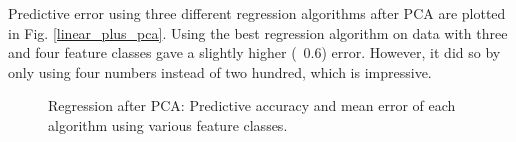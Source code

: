 Predictive error using three different regression algorithms after PCA are plotted in Fig. \ref{linear_plus_pca}. Using the best regression algorithm on data with three and four feature classes gave a slightly higher (~0.6) error. However, it did so by only using four numbers instead of two hundred, which is impressive.

\begin{figure}[t]
\centering
{}
\caption{Regression after PCA: Predictive accuracy and mean error of each algorithm using various feature classes.}
\label{linear_results}
\end{figure}
